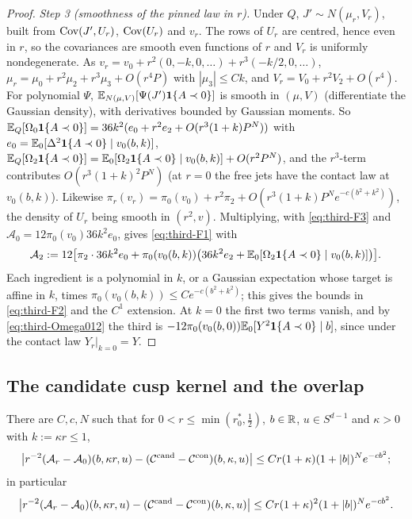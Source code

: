 \begin{proof}
\emph{Step 3 (smoothness of the pinned law in $r$).} Under $Q$, $J'\sim N(\mu_r,V_r)$, built from $\operatorname{Cov}(J',U_r)$, $\operatorname{Cov}(U_r)$ and $v_r$. The rows of $U_r$ are centred, hence even in $r$, so the covariances are smooth even functions of $r$ and $V_r$ is uniformly nondegenerate. As $v_r=v_0+r^2(0,-k,0,\dots)+r^3(-k/2,0,\dots)$, $\mu_r=\mu_0+r^2\mu_2+r^3\mu_3+O(r^4P)$ with $|\mu_3|\le Ck$, and $V_r=V_0+r^2V_2+O(r^4)$. For polynomial $\Psi$, $\mathbb E_{N(\mu,V)}[\Psi(J')\mathbf 1\{A\prec0\}]$ is smooth in $(\mu,V)$ (differentiate the Gaussian density), with derivatives bounded by Gaussian moments. So $\mathbb E_Q[\Omega_0\mathbf 1\{A\prec0\}]=36k^2(e_0+r^2e_2+O(r^3(1+k)P^N))$ with $e_0=\mathbb E_0[\Delta^2\mathbf 1\{A\prec0\}\mid v_0(b,k)]$, $\mathbb E_Q[\Omega_2\mathbf 1\{A\prec0\}]=\mathbb E_0[\Omega_2\mathbf 1\{A\prec0\}\mid v_0(b,k)]+O(r^2P^N)$, and the $r^3$-term contributes $O(r^3(1+k)^2P^N)$ (at $r=0$ the free jets have the contact law at $v_0(b,k)$). Likewise $\pi_r(v_r)=\pi_0(v_0)+r^2\pi_2+O(r^3(1+k)P^Ne^{-c(b^2+k^2)})$, the density of $U_r$ being smooth in $(r^2,v)$. Multiplying, with \eqref{eq:third-F3} and $\mathcal A_0=12\pi_0(v_0)36k^2e_0$, gives \eqref{eq:third-F1} with
\begin{equation}\label{eq:third-A2}
\mathcal A_2:=12\bigl[\pi_2\cdot36k^2e_0+\pi_0(v_0(b,k))\bigl(36k^2e_2+\mathbb E_0[\Omega_2\mathbf 1\{A\prec0\}\mid v_0(b,k)]\bigr)\bigr].
\end{equation}
Each ingredient is a polynomial in $k$, or a Gaussian expectation whose target is affine in $k$, times $\pi_0(v_0(b,k))\le Ce^{-c(b^2+k^2)}$; this gives the bounds in \eqref{eq:third-F2} and the $C^1$ extension. At $k=0$ the first two terms vanish, and by \eqref{eq:third-Omega012} the third is $-12\pi_0(v_0(b,0))\mathbb E_0[Y^2\mathbf 1\{A\prec0\}\mid b]$, since under the contact law $Y_r|_{k=0}=Y$.
\end{proof}

\subsection{The candidate cusp kernel and the overlap}\label{ssec:third-cusp}

\begin{lemma}\label{lem:third-C}
There are $C,c,N$ such that for $0<r\le\min(r_0^*,\frac12)$, $b\in\mathbb R$, $u\in S^{d-1}$ and $\kappa>0$ with $k:=\kappa r\le1$,
\begin{equation}\label{eq:third-Cp1}
\bigl|r^{-2}(\mathcal A_r-\mathcal A_0)(b,\kappa r,u)-(\mathcal C^{\mathrm{cand}}-\mathcal C^{\rm con})(b,\kappa,u)\bigr|\le Cr(1+\kappa)(1+|b|)^Ne^{-cb^2};
\end{equation}
in particular
\begin{equation}\label{eq:third-C1}
\bigl|r^{-2}(\mathcal A_r-\mathcal A_0)(b,\kappa r,u)-(\mathcal C^{\mathrm{cand}}-\mathcal C^{\rm con})(b,\kappa,u)\bigr|\le Cr(1+\kappa)^2(1+|b|)^Ne^{-cb^2}.
\end{equation}
\end{lemma}

